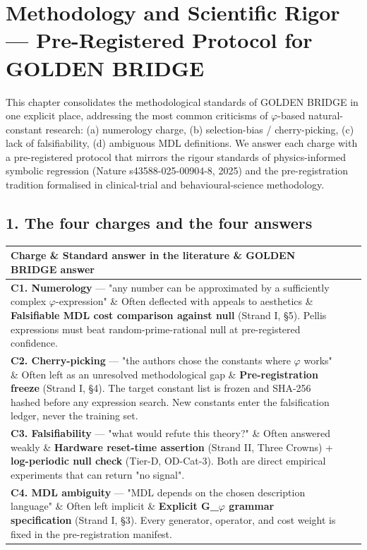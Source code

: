 
\section{Methodology and Scientific Rigor --- Pre-Registered Protocol for GOLDEN BRIDGE}

This chapter consolidates the methodological standards of GOLDEN BRIDGE in one explicit place, addressing the most common criticisms of $\varphi$-based natural-constant research: (a) numerology charge, (b) selection-bias / cherry-picking, (c) lack of falsifiability, (d) ambiguous MDL definitions. We answer each charge with a pre-registered protocol that mirrors the rigour standards of physics-informed symbolic regression (Nature s43588-025-00904-8, 2025) and the pre-registration tradition formalised in clinical-trial and behavioural-science methodology.

\subsection{1. The four charges and the four answers}

\begin{tabular}{|l|l|l|}
\hline
Charge \& Standard answer in the literature \& GOLDEN BRIDGE answer \\
\hline
\textbf{C1. Numerology} --- "any number can be approximated by a sufficiently complex $\varphi$-expression" \& Often deflected with appeals to aesthetics \& \textbf{Falsifiable MDL cost comparison against null} (Strand I, §5). Pellis expressions must beat random-prime-rational null at pre-registered confidence. \\
\textbf{C2. Cherry-picking} --- "the authors chose the constants where $\varphi$ works" \& Often left as an unresolved methodological gap \& \textbf{Pre-registration freeze} (Strand I, §4). The target constant list is frozen and SHA-256 hashed before any expression search. New constants enter the falsification ledger, never the training set. \\
\textbf{C3. Falsifiability} --- "what would refute this theory?" \& Often answered weakly \& \textbf{Hardware reset-time assertion} (Strand II, Three Crowns) + \textbf{log-periodic null check} (Tier-D, OD-Cat-3). Both are direct empirical experiments that can return "no signal". \\
\textbf{C4. MDL ambiguity} --- "MDL depends on the chosen description language" \& Often left implicit \& \textbf{Explicit G\_$\varphi$ grammar specification} (Strand I, §3). Every generator, operator, and cost weight is fixed in the pre-registration manifest. \\
\hline
\end{tabular}
